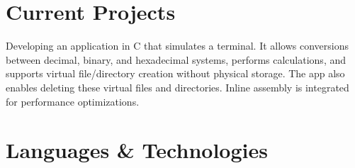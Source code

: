 \documentclass[letterpaper]{twentysecondcv} %
\begin{document}

\section{Current Projects}

\begin{twenty} %

    {Developing an application in C that simulates a terminal. It allows conversions between decimal, binary, and hexadecimal systems, performs calculations, and supports virtual file/directory creation without physical storage. The app also enables deleting these virtual files and directories. Inline assembly is integrated for performance optimizations.}


\end{twenty}



\section{Languages \& Technologies}

\begin{twentyshort} %




\end{twentyshort}
\end{document}
